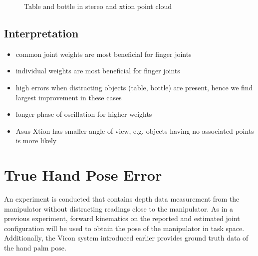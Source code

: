 \begin{figure}
\centering
{}
\hspace{1cm}
\caption{Table and bottle in stereo and xtion point cloud}
\label{fig:bottle_point_cloud}
\end{figure}

\subsection{Interpretation}

\begin{itemize}
\item common joint weights are most beneficial for finger joints
\item individual weights are most beneficial for finger joints
\item high errors when distracting objects (table, bottle) are present, hence we find largest improvement in these cases
\item longer phase of oscillation for higher weights
\item Asus Xtion has smaller angle of view, e.g. objects having no associated points is more likely
\end{itemize}




\section{True Hand Pose Error}

An experiment is conducted that contains depth data measurement from the manipulator without distracting readings close to the manipulator. As in a previous experiment, forward kinematics on the reported and estimated joint configuration will be used to obtain the pose of the manipulator in task space. Additionally, the Vicon system introduced earlier provides ground truth data of the hand palm pose.


